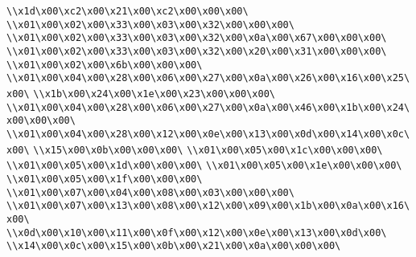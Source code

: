 \verb|\\x1d\x00\xc2\x00\x21\x00\xc2\x00\x00\x00\|\newline
\verb|\\x01\x00\x02\x00\x33\x00\x03\x00\x32\x00\x00\x00\|\newline
\verb|\\x01\x00\x02\x00\x33\x00\x03\x00\x32\x00\x0a\x00\x67\x00\x00\x00\|\newline
\verb|\\x01\x00\x02\x00\x33\x00\x03\x00\x32\x00\x20\x00\x31\x00\x00\x00\|\newline
\verb|\\x01\x00\x02\x00\x6b\x00\x00\x00\|\newline
\verb|\\x01\x00\x04\x00\x28\x00\x06\x00\x27\x00\x0a\x00\x26\x00\x16\x00\x25\x00\|\newline
\verb|\\x1b\x00\x24\x00\x1e\x00\x23\x00\x00\x00\|\newline
\verb|\\x01\x00\x04\x00\x28\x00\x06\x00\x27\x00\x0a\x00\x46\x00\x1b\x00\x24\x00\x00\x00\|\newline
\verb|\\x01\x00\x04\x00\x28\x00\x12\x00\x0e\x00\x13\x00\x0d\x00\x14\x00\x0c\x00\|\newline
\verb|\\x15\x00\x0b\x00\x00\x00\|\newline
\verb|\\x01\x00\x05\x00\x1c\x00\x00\x00\|\newline
\verb|\\x01\x00\x05\x00\x1d\x00\x00\x00\|\newline
\verb|\\x01\x00\x05\x00\x1e\x00\x00\x00\|\newline
\verb|\\x01\x00\x05\x00\x1f\x00\x00\x00\|\newline
\verb|\\x01\x00\x07\x00\x04\x00\x08\x00\x03\x00\x00\x00\|\newline
\verb|\\x01\x00\x07\x00\x13\x00\x08\x00\x12\x00\x09\x00\x1b\x00\x0a\x00\x16\x00\|\newline
\verb|\\x0d\x00\x10\x00\x11\x00\x0f\x00\x12\x00\x0e\x00\x13\x00\x0d\x00\|\newline
\verb|\\x14\x00\x0c\x00\x15\x00\x0b\x00\x21\x00\x0a\x00\x00\x00\|\newline
